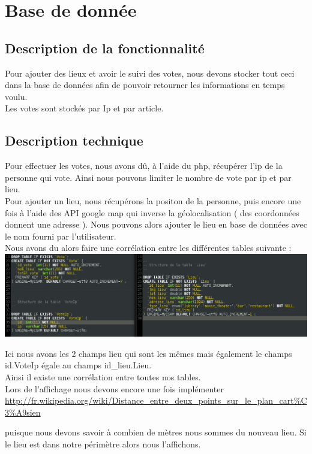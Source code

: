 \documentclass[10pt,a4paper]{report}
\begin{document}

\section{Base de donnée}

\subsection{Description de la fonctionnalité}
\begin{flushleft}
Pour ajouter des lieux et avoir le suivi des votes, nous devons stocker tout ceci dans la base de données afin de pouvoir retourner les informations en temps voulu. \\

Les votes sont stockés par Ip et par article. \\
\end{flushleft}

\subsection{Description technique}
\begin{flushleft}
Pour effectuer les votes, nous avons dû, à l'aide du php, récupérer l'ip de la personne qui vote. Ainsi nous pouvons limiter le nombre de vote par ip et par lieu. \\

Pour ajouter un lieu, nous récupérons la positon de la personne, puis encore une fois à l'aide des API google map qui inverse la géolocalisation ( des coordonnées donnent une adresse ). Nous pouvons alors ajouter le lieu en base de données avec le nom fourni par l'utilisateur. \\

Nous avons du alors faire une corrélation entre les différentes tables suivante :
\includegraphics[scale=0.5]{./images/BDD_Vote_Lieu.png}

Ici nous avons les 2 champs lieu qui sont les mêmes mais également le champs id.VoteIp égale au champs id\_lieu.Lieu. \\


Ainsi il existe une corrélation entre toutes nos tables. \\

Lors de l'affichage nous devons encore une fois implémenter 
\url{http://fr.wikipedia.org/wiki/Distance_entre_deux_points_sur_le_plan_cart%C3%A9sien}

puisque nous devons savoir à combien de mètres nous sommes du nouveau lieu.
Si le lieu est dans notre périmètre alors nous l'affichons.\\
\end{flushleft}
\end{document}
